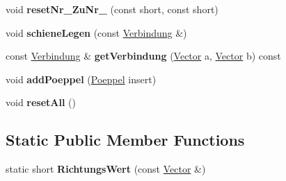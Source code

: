 \begin{DoxyCompactItemize}
\item 
\hypertarget{class_zustand_adcae9b5b3c032ceefdaac7c49fe6674f}{void {\bfseries reset\-Nr\-\_\-\-Zu\-Nr\-\_\-} (const short, const short)}\label{class_zustand_adcae9b5b3c032ceefdaac7c49fe6674f}

\item 
\hypertarget{class_zustand_a326f241888c2a8897c934d25a8d643b9}{void {\bfseries schiene\-Legen} (const \hyperlink{class_verbindung}{Verbindung} \&)}\label{class_zustand_a326f241888c2a8897c934d25a8d643b9}

\item 
\hypertarget{class_zustand_a1a0b109709853779b7fd4fa720dadbc3}{const \hyperlink{class_verbindung}{Verbindung} \& {\bfseries get\-Verbindung} (\hyperlink{class_vector}{Vector} a, \hyperlink{class_vector}{Vector} b) const }\label{class_zustand_a1a0b109709853779b7fd4fa720dadbc3}

\item 
\hypertarget{class_zustand_aaf796c394dae78069ef3891d75e53e67}{void {\bfseries add\-Poeppel} (\hyperlink{class_poeppel}{Poeppel} insert)}\label{class_zustand_aaf796c394dae78069ef3891d75e53e67}

\item 
\hypertarget{class_zustand_a948904b2d1d4da0868a6a4f063923f3f}{void {\bfseries reset\-All} ()}\label{class_zustand_a948904b2d1d4da0868a6a4f063923f3f}

\end{DoxyCompactItemize}
\subsection*{Static Public Member Functions}
\begin{DoxyCompactItemize}
\item 
\hypertarget{class_zustand_a5962a9e80efba68d605dda8a20431200}{static short {\bfseries Richtungs\-Wert} (const \hyperlink{class_vector}{Vector} \&)}\label{class_zustand_a5962a9e80efba68d605dda8a20431200}

\end{DoxyCompactItemize}
